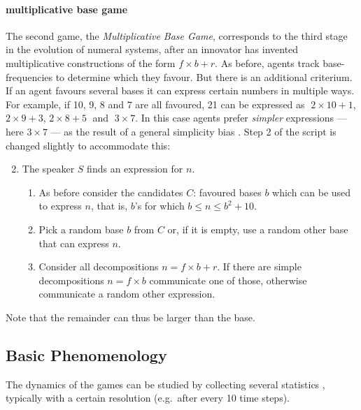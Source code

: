 \documentclass{../src/bcthesispart}
\begin{document}
\paragraph{multiplicative base game}
The second game, the \emph{Multiplicative Base Game}, corresponds to the third stage in the evolution of numeral systems, after an innovator has invented multiplicative constructions of the form $f\times b +r$.
As before, agents track base-frequencies to determine which they favour. 
But there is an additional criterium. 
If an agent favours several bases it can express certain numbers in multiple ways.
For example, if 10, 9, 8 and 7 are all favoured, 21 can be expressed as
$\;2\times 10 + 1$, \; $2\times 9 + 3$,\; $2\times 8 + 5\;$ and $\;3 \times 7$.
In this case agents prefer \emph{simpler} expressions --- here $3 \times 7$ --- as the result of a general simplicity bias \parencite{Hurford1987}.
Step 2 of the script is changed slightly to accommodate this:
\begin{enumerate}\setcounter{enumi}{1}
	\item The speaker $S$ finds an expression for $n$. 
	\begin{enumerate}
		\item As before consider the candidates $C$: favoured bases $b$ which can be used to express $n$, that is, $b$’s for which $b \le n \le b^2+10$.
		\item Pick a random base $b$ from $C$ or, if it is empty, use a random other base that can express $n$.
		\item Consider all decompositions $n=f\times b + r$. If there are simple decompositions $n=f\times b$ communicate one of those, otherwise communicate a random other expression.
	\end{enumerate} 
\end{enumerate}
Note that the remainder can thus be larger than the base.



\subsection{Basic Phenomenology}
The dynamics of the games can be studied by collecting several  statistics \parencite[cf.][]{Baronchelli2017,Wellens2012}, typically with a certain resolution (e.g.\ after every 10 time steps).
\end{document}
